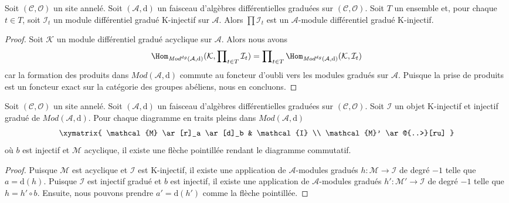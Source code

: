 \begin{lemma}
\label{lemma-product-K-injective}
Soit $(\mathcal{C}, \mathcal{O})$ un site annelé.
Soit $(\mathcal{A}, \text{d})$ un faisceau d'algèbres différentielles graduées sur $(\mathcal{C}, \mathcal{O})$.
Soit $T$ un ensemble et, pour chaque $t \in T$, soit $\mathcal{I}_t$ un module différentiel gradué K-injectif sur $\mathcal{A}$.
Alors $\prod \mathcal{I}_t$ est un $\mathcal{A}$-module différentiel gradué K-injectif.
\end{lemma}

\begin{proof}
Soit $\mathcal{K}$ un module différentiel gradué acyclique sur $\mathcal{A}$.
Alors nous avons
$$
\Hom_{\textit{Mod}^{dg}(\mathcal{A}, \text{d})}(\mathcal{K},
\prod\nolimits_{t \in T} \mathcal{I}_t)
=
\prod\nolimits_{t \in T}
\Hom_{\textit{Mod}^{dg}(\mathcal{A}, \text{d})}(\mathcal{K}, \mathcal{I}_t)
$$
car la formation des produits dans $\textit{Mod}(\mathcal{A}, \text{d})$ commute au foncteur d'oubli vers les modules gradués sur $\mathcal{A}$.
Puisque la prise de produits est un foncteur exact sur la catégorie des groupes abéliens, nous en concluons.
\end{proof}

\begin{lemma}
\label{lemma-first-property-dg-injective}
Soit $(\mathcal{C}, \mathcal{O})$ un site annelé.
Soit $(\mathcal{A}, \text{d})$ un faisceau d'algèbres différentielles graduées sur $(\mathcal{C}, \mathcal{O})$.
Soit $\mathcal{I}$ un objet K-injectif et injectif gradué de $\textit{Mod}(\mathcal{A}, \text{d})$.
Pour chaque diagramme en traits pleins dans $\textit{Mod}(\mathcal{A}, \text{d})$
$$
\xymatrix{
\mathcal{M} \ar[r]_a \ar[d]_b & \mathcal{I} \\
\mathcal{M}' \ar@{..>}[ru]
}
$$
où $b$ est injectif et $\mathcal{M}$ acyclique, il existe une flèche pointillée rendant le diagramme commutatif.
\end{lemma}

\begin{proof}
Puisque $\mathcal{M}$ est acyclique et $\mathcal{I}$ est K-injectif, il existe une application de $\mathcal{A}$-modules gradués $h : \mathcal{M} \to \mathcal{I}$ de degré $-1$ telle que $a = \text{d}(h)$.
Puisque $\mathcal{I}$ est injectif gradué et $b$ est injectif, il existe une application de $\mathcal{A}$-modules gradués $h' : \mathcal{M}' \to \mathcal{I}$ de degré $-1$ telle que $h = h' \circ b$.
Ensuite, nous pouvons prendre $a' = \text{d}(h')$ comme la flèche pointillée.
\end{proof}

